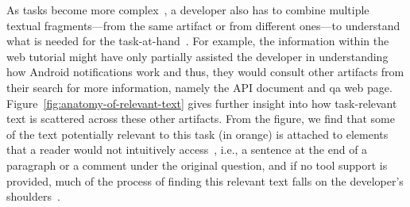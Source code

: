  
 
 
 
 
 As tasks become more complex~\cite{Pirolli2007, Bystrom1995}, a developer also has to combine multiple textual fragments---from the same artifact or from different ones---to understand what is needed for the task-at-hand~\cite{Piorkowski2016}. 
 For example, the information within the web tutorial 
 might have only partially assisted the developer in understanding how 
 Android notifications work and thus, they would consult other artifacts from their search for more information, namely the API document and \acs{qa} web page. 
 Figure~\ref{fig:anatomy-of-relevant-text} gives further insight into 
 how task-relevant text 
 is scattered across these other artifacts. 
 From the figure, we find that some of the text potentially relevant to this task (in orange) is attached to elements that a reader would not intuitively access~\cite{Robillard2015}, i.e., 
 a sentence at the end of a paragraph or a comment under the original question,
 and if no tool support is provided, much of the process of finding this relevant text falls on the developer's shoulders~\cite{gonccalves2011, Ko2006a, Bystrom1995}.
 
 
 
